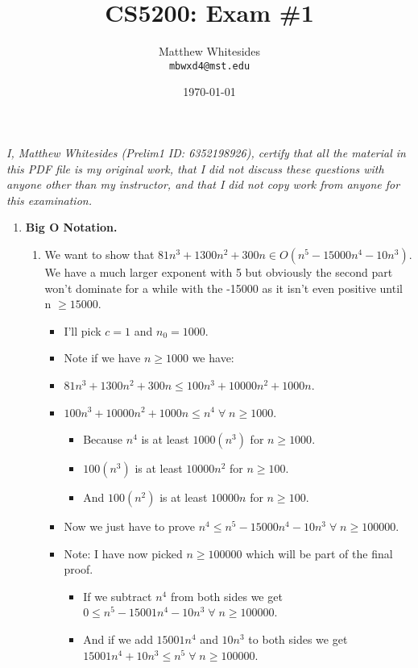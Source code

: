 \documentclass{article}
\title{CS5200: Exam \#1} %
\author{Matthew Whitesides\\ \texttt{mbwxd4@mst.edu}} %
\date{\today} %
\begin{document}
  \maketitle %
  
  \textit{I, Matthew Whitesides (Prelim1 ID: 6352198926), certify that all the material in this PDF file is my original work, that I did not discuss these questions with anyone other than my instructor, and that I did not copy work from anyone for this examination.}

  \begin{enumerate}
    \item \textbf{Big O Notation.}
    \begin{enumerate}
      \item We want to show that $81n^3 + 1300n^2 + 300n \in O(n^5 - 15000n^4 - 10n^3)$. We have a much larger exponent with 5 but obviously the second part won't dominate for a while with the -15000 as it isn't even positive until n $\ge 15000$.
      \begin{itemize}
        \item I'll pick $c = 1$ and $n_0 = 1000$.
        \item Note if we have $n \geq 1000$ we have:
        \item $81n^3 + 1300n^2 + 300n \le 100n^3 + 10000n^2 + 1000n$.
        \item $100n^3 + 10000n^2 + 1000n \le n^4 \;\forall\; n \geq 1000$.
          \begin{itemize}
            \item Because $n^4$ is at least $1000(n^3)$ for $n \geq 1000$.
            \item $100(n^3)$ is at least $10000n^2$ for $n \geq 100$. 
            \item And $100(n^2)$ is at least $10000n$ for $n \geq 100$.
          \end{itemize}
          \item Now we just have to prove $n^4 \leq n^5 - 15000n^4 - 10n^3 \;\forall\; n \geq 100000$.
          \item Note: I have now picked $n \geq 100000$ which will be part of the final proof.
          \begin{itemize}
            \item If we subtract $n^4$ from both sides we get \\ $0 \leq n^5 - 15001n^4 - 10n^3 \;\forall\; n \geq 100000$.
            \item And if we add $15001n^4$ and $10n^3$ to both sides we get \\ $15001n^4 + 10n^3 \leq n^5 \;\forall\; n \geq 100000$.

\end{itemize}
\end{itemize}
\end{enumerate}
\end{enumerate}
\end{document}
